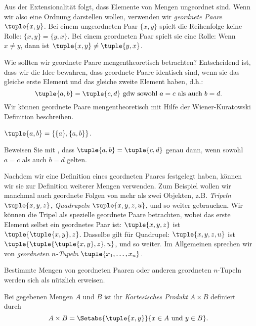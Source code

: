 \documentclass[../../../include/open-logic-section]{subfiles}
\begin{document}

\begin{explain}
Aus der Extensionalität folgt, dass Elemente von Mengen ungeordnet sind.
Wenn wir also eine Ordnung darstellen wollen, verwenden wir \emph{geordnete
Paare} $\tuple{x, y}$. Bei einem ungeordneten Paar $\{x, y\}$ spielt die Reihenfolge
keine Rolle: $\{x, y\} = \{y, x\}$. Bei einem geordneten Paar spielt sie eine Rolle: Wenn $x
\neq y$, dann ist $\tuple{x, y} \neq \tuple{y, x}$.

Wie sollten wir geordnete Paare mengentheoretisch betrachten?
Entscheidend ist, dass wir die Idee bewahren,
dass geordnete Paare identisch sind, wenn sie
das gleiche erste Element und das gleiche zweite Element haben, d.h.:
\[
  \tuple{a, b}= \tuple{c, d}\text{ gdw sowohl }a = c \text{ als auch }b=d.
\]
Wir können geordnete Paare mengentheoretisch mit Hilfe der Wiener-Kuratowski
Definition beschreiben.
\end{explain}

\begin{defn}
	$\tuple{a, b} = \{\{a\}, \{a, b\}\}$.
\end{defn}

\begin{prob}
	Beweisen Sie mit , dass $\tuple{a,
	b}= \tuple{c, d}$ genau dann, wenn sowohl $a = c$ als auch $b=d$ gelten.
\end{prob}

\begin{explain}
Nachdem wir eine Definition eines geordneten Paares festgelegt haben, 
können wir sie zur Definition
weiterer Mengen verwenden. Zum Beispiel wollen wir manchmal auch geordnete Folgen von
mehr als zwei Objekten, z.B. \emph{Tripeln} $\tuple{x, y, z}$,
\emph{Quadrupeln} $\tuple{x, y, z, u}$, und so weiter gebrauchen.  Wir können die
Tripel als spezielle geordnete Paare betrachten, wobei das erste Element selbst ein
geordnetes Paar ist: $\tuple{x, y, z}$ ist $\tuple{\tuple{x, y},z}$. Dasselbe
gilt für Quadrupel: $\tuple{x,y,z,u}$ ist
$\tuple{\tuple{\tuple{x,y},z},u}$, und so weiter. Im Allgemeinen sprechen wir von
\emph{geordneten $n$-Tupeln} $\tuple{x_1, \dots, x_n}$.

Bestimmte Mengen von geordneten Paaren oder anderen geordneten $n$-Tupeln werden sich als nützlich erweisen.
\end{explain}

\begin{defn}
Bei gegebenen Mengen $A$ und $B$ ist ihr \emph{Kartesisches Produkt} $A \times B$
definiert durch
\[
  A \times B = \Setabs{\tuple{x, y}}{x \in A \text{ und } y \in B}.
\]
\end{defn}
\end{document}
